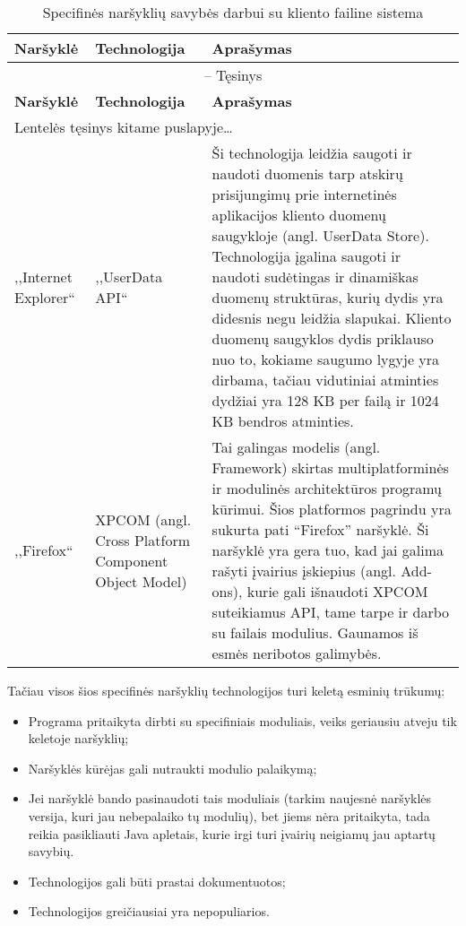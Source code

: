 \documentclass[12pt,a4paper,titlepage]{article}
\begin{document}
\begin{longtable}{|p{2cm}|p{3cm}|p{7.8cm}|}
\caption{Specifinės naršyklių savybės darbui su kliento failine sistema \label{table:naršyklės}}\\

\hline \hline
{\textbf{Naršyklė}} &
{\textbf{Technologija}} &
{\textbf{Aprašymas}}\\
\hline
\endfirsthead


\multicolumn{3}{c}{{\tablename} \thetable{} -- Tęsinys} \\[0.5ex]
\hline \hline
{\textbf{Naršyklė}} &
{\textbf{Technologija}} &
{\textbf{Aprašymas}}\\
\hline
\endhead


\multicolumn{3}{l}{{Lentelės tęsinys kitame puslapyje\ldots}} \\
\endfoot


\hline \hline
\endlastfoot
\hline 
,,Internet Explorer``
&
,,UserData API``
&
Ši technologija leidžia saugoti ir naudoti duomenis tarp atskirų prisijungimų prie internetinės aplikacijos kliento duomenų saugykloje (angl. UserData Store). Technologija įgalina saugoti ir naudoti sudėtingas ir dinamiškas duomenų struktūras, kurių dydis yra didesnis negu leidžia slapukai. Kliento duomenų saugyklos dydis priklauso nuo to, kokiame saugumo lygyje yra dirbama, tačiau vidutiniai atminties dydžiai yra 128 KB per failą ir 1024 KB bendros atminties.
\\
\hline
,,Firefox``
&
XPCOM (angl. Cross Platform Component Object Model)
&
Tai galingas modelis (angl. Framework) skirtas multiplatforminės ir modulinės architektūros programų kūrimui. Šios platformos pagrindu yra sukurta pati “Firefox” naršyklė. Ši naršyklė yra gera tuo, kad jai galima rašyti įvairius įskiepius (angl. Add-ons), kurie gali išnaudoti XPCOM suteikiamus API, tame tarpe ir darbo su failais modulius. Gaunamos iš esmės neribotos galimybės.
\end{longtable}

Tačiau visos šios specifinės naršyklių technologijos turi keletą esminių trūkumų:
\begin{itemize}
  \item Programa pritaikyta dirbti su specifiniais moduliais, veiks geriausiu atveju tik keletoje naršyklių;
  \item Naršyklės kūrėjas gali nutraukti modulio palaikymą;
  \item Jei naršyklė bando pasinaudoti tais moduliais (tarkim naujesnė naršyklės versija, kuri jau nebepalaiko tų modulių), bet jiems nėra pritaikyta, tada reikia pasikliauti Java apletais, kurie irgi turi įvairių neigiamų jau aptartų savybių.
  \item Technologijos gali būti prastai dokumentuotos;
  \item Technologijos greičiausiai yra nepopuliarios.
\end{itemize}
\end{document}

